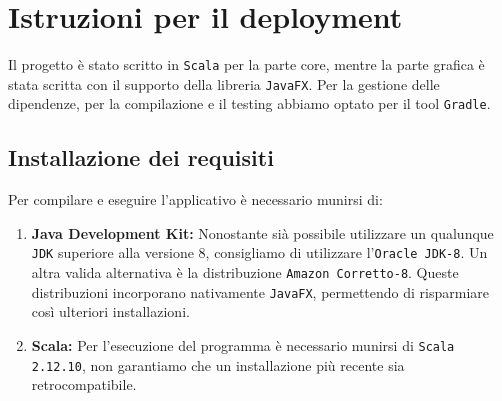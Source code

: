 \section{Istruzioni per il deployment}
	Il progetto è stato scritto in \texttt{Scala} per la parte core, mentre la parte grafica è stata scritta con il supporto della libreria \texttt{JavaFX}.
	Per la gestione delle dipendenze, per la compilazione e il testing abbiamo optato per il tool \texttt{Gradle}.

	\subsection{Installazione dei requisiti}
	 Per compilare e eseguire l'applicativo è necessario munirsi di:
	 \begin{enumerate}
	 	\item \textbf{Java Development Kit:}
	 		Nonostante sià possibile utilizzare un qualunque \texttt{JDK} superiore alla versione 8, consigliamo di utilizzare l'\texttt{Oracle JDK-8}.
	 		Un altra valida alternativa è la distribuzione \texttt{Amazon Corretto-8}\cite{AmazonCorrettoSite}.
	 		Queste distribuzioni incorporano nativamente \texttt{JavaFX}, permettendo di risparmiare così ulteriori installazioni.
	 		
	 	\item \textbf{Scala: }
	 		Per l'esecuzione del programma è necessario munirsi di \texttt{Scala 2.12.10}, non garantiamo che un installazione più recente sia retrocompatibile.
	 	 
	 \end{enumerate}
 		
